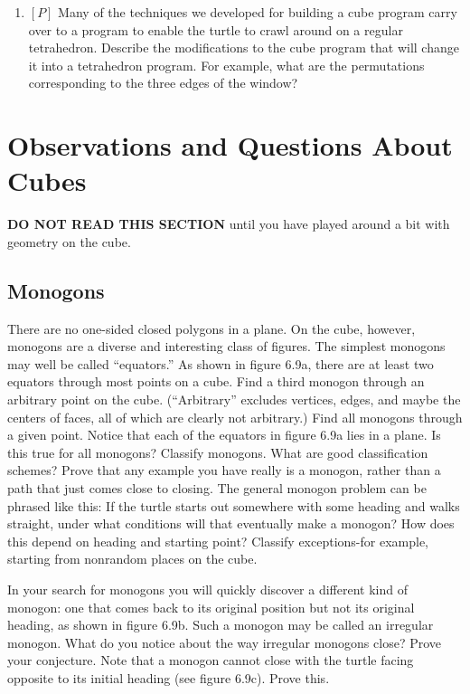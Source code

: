 \documentclass{book}
\begin{document}
\begin{enumerate}
\item $[P]$ Many of the techniques we developed for building a cube program
carry over to a program to enable the turtle to crawl around on a
regular tetrahedron. Describe the modifications to the cube program
that will change it into a tetrahedron program. For example, what are
the permutations corresponding to the three edges of the window?
\end{enumerate}

\section{Observations and Questions About Cubes}

\textbf{DO NOT READ THIS SECTION} until you have played around a bit
with geometry on the cube.

\subsection{Monogons}

There are no one-sided closed polygons in a plane. On the cube, however,
monogons are a diverse and interesting class of figures. The simplest
monogons may well be called ``equators.'' As shown in figure 6.9a, there
are at least two equators through most points on a cube. Find a third
monogon through an arbitrary point on the cube. (``Arbitrary'' excludes
vertices, edges, and maybe the centers of faces, all of which are clearly
not arbitrary.) Find all monogons through a given point. Notice that
each of the equators in figure 6.9a lies in a plane. Is this true for all
monogons? Classify monogons. What are good classification schemes?
Prove that any example you have really is a monogon, rather than a
path that just comes close to closing. The general monogon problem
can be phrased like this: If the turtle starts out somewhere with some
heading and walks straight, under what conditions will that eventually
make a monogon? How does this depend on heading and starting point?
Classify exceptions-for example, starting from nonrandom places on
the cube.

In your search for monogons you will quickly discover a different kind
of monogon: one that comes back to its original position but not its
original heading, as shown in figure 6.9b. Such a monogon may be called
an irregular monogon. What do you notice about the way irregular
monogons close? Prove your conjecture. Note that a monogon cannot
close with the turtle facing opposite to its initial heading (see figure
6.9c). Prove this.
\end{document}
